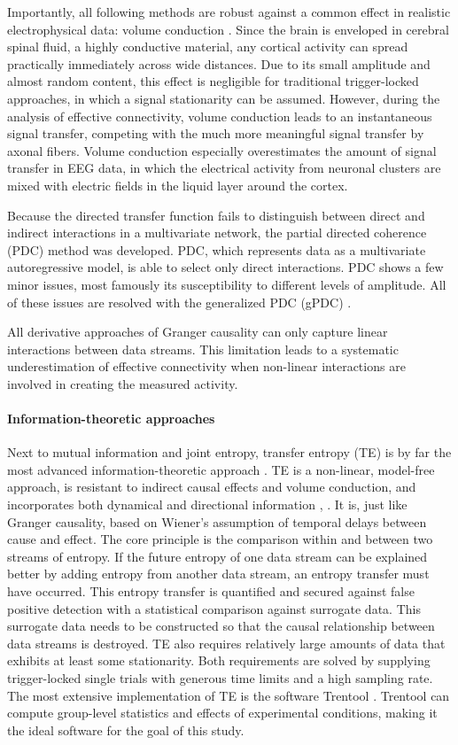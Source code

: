 Importantly, all following methods are robust against a common effect in realistic electrophysical data: volume conduction \cite{1.5.PDC}.
Since the brain is enveloped in cerebral spinal fluid, a highly conductive material, any cortical activity can spread practically immediately across wide distances.
Due to its small amplitude and almost random content, this effect is negligible for traditional trigger-locked approaches, in which a signal stationarity can be assumed.
However, during the analysis of effective connectivity, volume conduction leads to an instantaneous signal transfer, competing with the much more meaningful signal transfer by axonal fibers.
Volume conduction especially overestimates the amount of signal transfer in EEG data, in which the electrical activity from neuronal clusters are mixed with electric fields in the liquid layer around the cortex.

Because the directed transfer function fails to distinguish between direct and indirect interactions in a multivariate network, the partial directed coherence (PDC) method was developed.
PDC, which represents data as a multivariate autoregressive model, is able to select only direct interactions.
PDC shows a few minor issues, most famously its susceptibility to different levels of amplitude.
All of these issues are resolved with the generalized PDC (gPDC) \cite{1.5.gPDC}.

All derivative approaches of Granger causality can only capture linear interactions between data streams.
This limitation leads to a systematic underestimation of effective connectivity when non-linear interactions are involved in creating the measured activity.

\paragraph{Information-theoretic approaches}
Next to mutual information and joint entropy, transfer entropy (TE) is by far the most advanced information-theoretic approach \cite{1.5.TEcomparison}.
TE is a non-linear, model-free approach, is resistant to indirect causal effects and volume conduction, and incorporates both dynamical and directional information \cite{3.4.TE.a}, \cite{3.4.TE.b}.
It is, just like Granger causality, based on Wiener's assumption of temporal delays between cause and effect.
The core principle is the comparison within and between two streams of entropy.
If the future entropy of one data stream can be explained better by adding entropy from another data stream, an entropy transfer must have occurred.
This entropy transfer is quantified and secured against false positive detection with a statistical comparison against surrogate data.
This surrogate data needs to be constructed so that the causal relationship between data streams is destroyed.
TE also requires relatively large amounts of data that exhibits at least some stationarity.
Both requirements are solved by supplying trigger-locked single trials with generous time limits and a high sampling rate.
The most extensive implementation of TE is the software Trentool \cite{3.4.Trentool}.
Trentool can compute group-level statistics and effects of experimental conditions, making it the ideal software for the goal of this study.